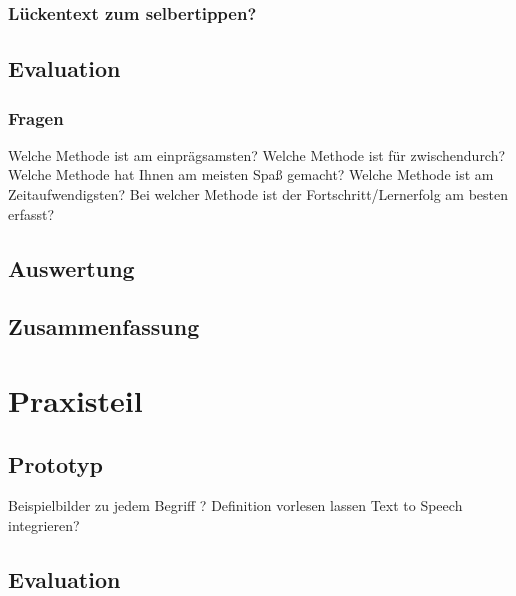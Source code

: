 \documentclass[a4paper, 12pt, twoside, BCOR=20mm, DIV=calc, abstracton, parskip=half*, toc=bibliography, toc=listof, headsepline, headings=small, numbers=enddot]{scrreprt} %
\begin{document}
\subsection{Lückentext zum selbertippen?}

\section{Evaluation}
\subsection{Fragen}
Welche Methode ist am einprägsamsten?
Welche Methode ist für zwischendurch?
Welche Methode hat Ihnen am meisten Spaß gemacht?
Welche Methode ist am Zeitaufwendigsten?
Bei welcher Methode ist der Fortschritt/Lernerfolg am besten erfasst?
\section{Auswertung}

\section{Zusammenfassung} 
\chapter{Praxisteil}
\section{Prototyp}
Beispielbilder zu jedem Begriff ? Definition vorlesen lassen Text to Speech integrieren?
\section{Evaluation}
\section{}


\printbibliography
\end{document}
